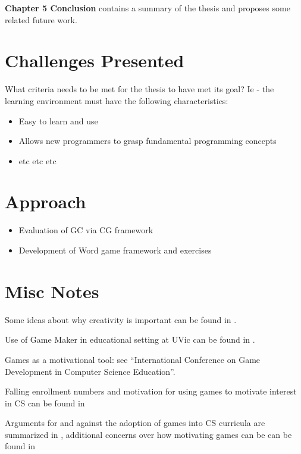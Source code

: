 
\textbf{Chapter 5 Conclusion} contains a summary of the thesis and proposes some related future work.

\section{Challenges Presented}

What criteria needs to be met for the thesis to have met its goal?  Ie - the learning environment must have the following characteristics:

\begin{itemize}
	\item Easy to learn and use
	\item Allows new programmers to grasp fundamental programming concepts
	\item etc etc etc
\end{itemize}

\section{Approach}

\begin{itemize}
	\item Evaluation of GC via CG framework
	\item Development of Word game framework and exercises
\end{itemize}



\section{Misc Notes}

Some ideas about why creativity is important can be found in \cite{Farooq06}.

Use of Game Maker in educational setting at UVic can be found in \cite{Gooch08}.

Games as a motivational tool: see ``International Conference on Game Development in Computer Science Education''.

Falling enrollment numbers and motivation for using games to motivate interest in CS can be found in \cite{Barnes08}

Arguments for and against the adoption of games into CS curricula are summarized in \cite{Walker03}, additional concerns over how motivating games can be can be found in \cite{DiSalvo09}


